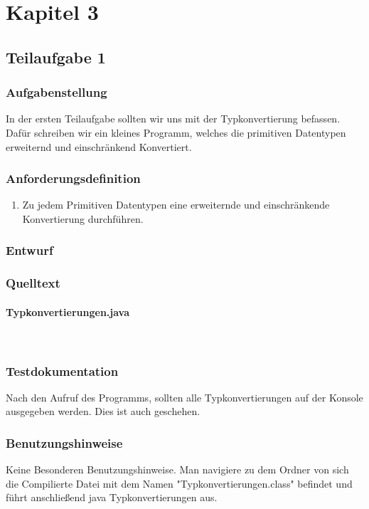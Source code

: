 \section{Kapitel 3}
\subsection{Teilaufgabe 1}
\subsubsection{Aufgabenstellung}
In der ersten Teilaufgabe sollten wir uns mit der Typkonvertierung befassen. Dafür schreiben wir
ein kleines Programm, welches die primitiven Datentypen erweiternd und einschränkend
Konvertiert.

\subsubsection{Anforderungsdefinition}
\begin{enumerate}
	\item Zu jedem Primitiven Datentypen eine erweiternde und einschränkende Konvertierung
	durchführen.
\end{enumerate}

\subsubsection{Entwurf}


\subsubsection{Quelltext}
\paragraph{Typkonvertierungen.java}\


\subsubsection{Testdokumentation}
Nach den Aufruf des Programms, sollten alle Typkonvertierungen auf der Konsole ausgegeben
werden. Dies ist auch geschehen.

\subsubsection{Benutzungshinweise}
Keine Besonderen Benutzungshinweise.
Man navigiere zu dem Ordner von sich die Compilierte Datei mit dem Namen "Typkonvertierungen.class"
\space befindet und führt anschlie\ss end java Typkonvertierungen aus.

